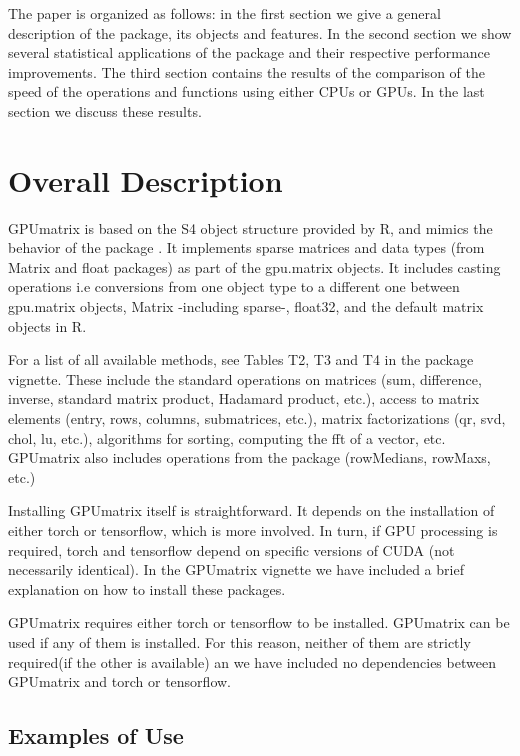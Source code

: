 The paper is organized as follows: in the first section we give a general description of the package, its objects and features. In the second section we show several statistical applications of the package and their respective performance improvements. The third section contains the results of the comparison of the speed of the operations and functions using either CPUs or GPUs. In the last section we discuss these results.

\hypertarget{overall-description}{%
\section{Overall Description}\label{overall-description}}

GPUmatrix is based on the S4 object structure provided by R, and mimics the behavior of the  package \citep{Matrix}. It implements sparse matrices and  \citep{float2017guide} data types (from Matrix and float packages) as part of the gpu.matrix objects. It includes casting operations i.e conversions from one object type to a different one between gpu.matrix objects, Matrix -including sparse-, float32, and the default matrix objects in R.

For a list of all available methods, see Tables T2, T3 and T4 in the package vignette. These include the standard operations on matrices (sum, difference, inverse, standard matrix product, Hadamard product, etc.), access to matrix elements (entry, rows, columns, submatrices, etc.), matrix factorizations (qr, svd, chol, lu, etc.), algorithms for sorting, computing the fft of a vector, etc. GPUmatrix also includes operations from the  package \citep{matrixStats} (rowMedians, rowMaxs, etc.)

Installing GPUmatrix itself is straightforward. It depends on the installation of either torch or tensorflow, which is more involved. In turn, if GPU processing is required, torch and tensorflow depend on specific versions of CUDA (not necessarily identical). In the GPUmatrix vignette we have included a brief explanation on how to install these packages.

GPUmatrix requires either torch or tensorflow to be installed. GPUmatrix can be used if any of them is installed. For this reason, neither of them are strictly required(if the other is available) an we have included no dependencies between GPUmatrix and torch or tensorflow.

\hypertarget{examples-of-use}{%
\subsection{Examples of Use}\label{examples-of-use}}


